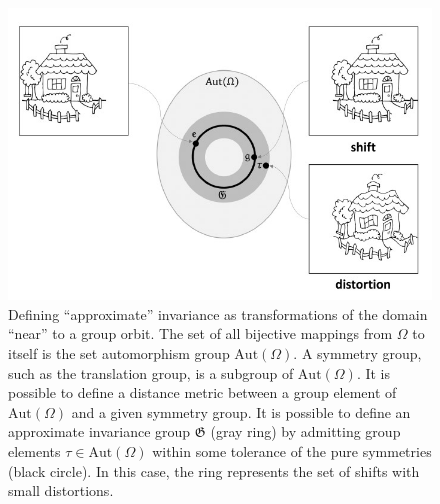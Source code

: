 \documentclass[11pt]{article}
\numberwithin{equation}{section}
\begin{document}
\begin{figure}
\begin{center}
\includegraphics[width=0.7\columnwidth]{../figures/automorphism-group.jpg}  
\end{center}
\caption{Defining ``approximate'' invariance as transformations of the domain ``near'' to a group orbit. The set of all bijective mappings from $\Omega$ to itself is the set automorphism group $\mathrm{Aut}(\Omega)$. A symmetry group, such as the translation group, is a subgroup of $\mathrm{Aut}(\Omega)$. It is possible to define a distance metric between a group element of $\mathrm{Aut}(\Omega)$ and a given symmetry group. It is possible to define an approximate invariance group $\mathfrak{G}$ (gray ring) by admitting group elements $\tau \in \mathrm{Aut}(\Omega)$ within some tolerance of the pure symmetries (black circle). In this case, the ring represents the set of shifts with small distortions.
}
\label{fig:approx-invar}
\end{figure}

\newpage
 
\end{document}
